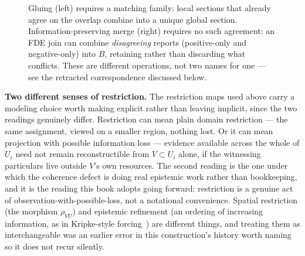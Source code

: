 \begin{figure}[htbp]
\centering
{}
\caption{Gluing (left) requires a matching family: local sections that
already agree on the overlap combine into a unique global section.
Information-preserving merge (right) requires no such agreement: an FDE
join can combine \emph{disagreeing} reports (positive-only and
negative-only) into $B$, retaining rather than discarding what conflicts.
These are different operations, not two names for one --- see the
retracted correspondence discussed below.}
\label{fig:gluing-vs-merge}
\end{figure}

\textbf{Two different senses of restriction.} The restriction maps used above
carry a modeling choice worth making explicit rather than leaving
implicit, since the two readings genuinely differ. Restriction can mean
plain domain restriction --- the same assignment, viewed on a smaller
region, nothing lost. Or it can mean projection with possible
information loss --- evidence available across the whole of \(U_i\) need not
remain reconstructible from \(V \subset U_i\) alone, if the witnessing
particulars live outside \(V\)'s own resources. The second reading is the
one under which the coherence defect is doing real epistemic work rather
than bookkeeping, and it is the reading this book adopts going forward:
restriction is a genuine act of observation-with-possible-loss, not a
notational convenience. Spatial restriction (the morphism \(\rho_{VU}\))
and epistemic refinement (an ordering of increasing information, as in
Kripke-style forcing~\cite{kripke1963}) are different things, and treating them as
interchangeable was an earlier error in this construction's history worth
naming so it does not recur silently.

